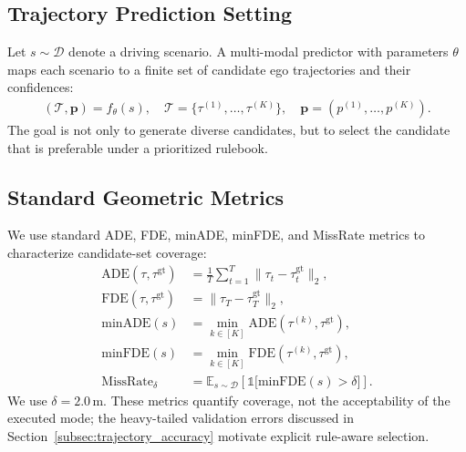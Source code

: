 \subsection{Trajectory Prediction Setting}
\label{subsec:prediction_setting}

Let $s \sim \mathcal{D}$ denote a driving scenario. A multi-modal predictor with parameters $\theta$ maps each scenario to a finite set of candidate ego trajectories and their confidences:
\begin{align}
(\mathcal{T}, \mathbf{p}) = f_\theta(s), \quad
\mathcal{T} = \{\tau^{(1)},\ldots,\tau^{(K)}\}, \quad
\mathbf{p} = (p^{(1)}, \ldots, p^{(K)}).
\end{align}
The goal is not only to generate diverse candidates, but to select the candidate that is preferable under a prioritized rulebook.

\subsection{Standard Geometric Metrics}
\label{subsec:geometric_metrics}

We use standard ADE, FDE, minADE, minFDE, and MissRate metrics to characterize candidate-set coverage:
\begin{align}
\text{ADE}(\tau, \tau^{\mathrm{gt}}) &= \frac{1}{T} \sum_{t=1}^T \| \tau_t - \tau^{\mathrm{gt}}_t \|_2, \\
\text{FDE}(\tau, \tau^{\mathrm{gt}}) &= \| \tau_T - \tau^{\mathrm{gt}}_T \|_2, \\
\text{minADE}(s) &= \min_{k \in [K]} \text{ADE}(\tau^{(k)}, \tau^{\mathrm{gt}}), \\
\text{minFDE}(s) &= \min_{k \in [K]} \text{FDE}(\tau^{(k)}, \tau^{\mathrm{gt}}), \\
\text{MissRate}_\delta &= \mathbb{E}_{s \sim \mathcal{D}} \left[ \mathbb{1}\big[\text{minFDE}(s) > \delta\big] \right].
\end{align}
We use $\delta = 2.0\,\mathrm{m}$. These metrics quantify coverage, not the acceptability of the executed mode; the heavy-tailed validation errors discussed in Section~\ref{subsec:trajectory_accuracy} motivate explicit rule-aware selection.

